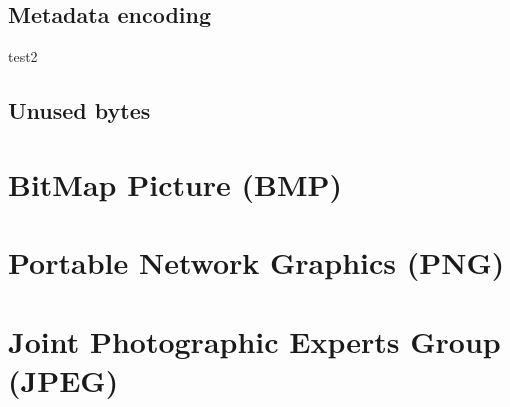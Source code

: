 \subsection{Metadata encoding}
test2
\subsection{Unused bytes}

\section{BitMap Picture (BMP)}

\section{Portable Network Graphics (PNG)}

\section{Joint Photographic Experts Group (JPEG)}